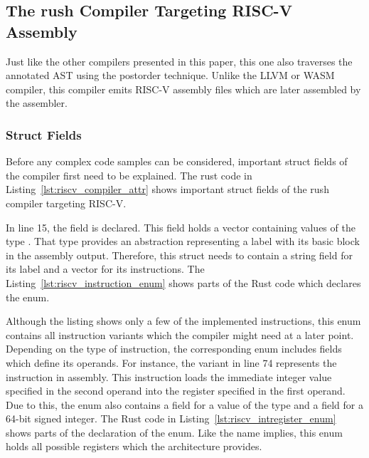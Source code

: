 \subsection{The rush Compiler Targeting RISC-V Assembly}

Just like the other compilers presented in this paper, this one also traverses the annotated AST using the postorder technique.
Unlike the LLVM or WASM compiler, this compiler emits RISC-V assembly files which are later assembled by the assembler.

\subsubsection{Struct Fields}

Before any complex code samples can be considered, important struct fields of the compiler first need to be explained.
The rust code in Listing~\ref{lst:riscv_compiler_attr} shows important struct fields of the rush compiler targeting RISC-V.


In line 15, the field  is declared.
This field holds a vector containing values of the type .
That type provides an abstraction representing a label with its basic block in the assembly output.
Therefore, this struct needs to contain a string field for its label and a vector for its instructions.
The Listing~\ref{lst:riscv_instruction_enum} shows parts of the Rust code which declares the  enum.


Although the listing shows only a few of the implemented instructions, this enum contains all instruction variants which the compiler might need at a later point.
Depending on the type of instruction, the corresponding enum includes fields which define its operands.
For instance, the  variant in line 74 represents the  instruction in assembly.
This instruction loads the immediate integer value specified in the second operand into the register specified in the first operand.
Due to this, the enum also contains a field for a value of the type  and a field for a 64-bit signed integer.
The Rust code in Listing~\ref{lst:riscv_intregister_enum} shows parts of the declaration of the  enum.
Like the name implies, this enum holds all possible registers which the architecture provides.

